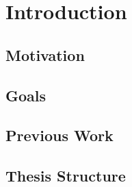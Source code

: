 \chapter{Introduction}
\section{Motivation}
\section{Goals}
\section{Previous Work}
\section{Thesis Structure}